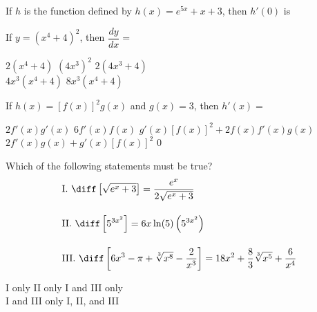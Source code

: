 \begin{questions}
    \question If $h$ is the function defined by $h(x) = e^{5x} + x + 3$, then $h'(0) $ is \\

    \begin{oneparchoices}
    \end{oneparchoices} \par \horizontalline

    \question If $y = \left(x^4 + 4\right)^2$, then $\dfrac{dy}{dx} = $ \\

    \begin{oneparchoices}
        \choice $2\left(x^4 + 4\right)$
        \choice $\left(4x^3\right)^2$
        \choice $2\left(4x^3 + 4\right)$ \\[11pt]
        \makebox[0.23 \textwidth] \choice $4x^3\left(x^4 + 4\right)$
        \makebox[0.25 \textwidth] \choice $8x^3\left(x^4 + 4\right)$
    \end{oneparchoices} \par \horizontalline

    \question If $h(x) = \left[f(x)\right]^2 g(x)$ and $g(x) = 3$, then $h'(x) = $ \\

    \begin{oneparchoices}
        \choice $2f'(x)g'(x)$
        \choice $6f'(x)f(x)$
        \choice $g'(x)\left[f(x)\right]^2 + 2f(x)f'(x)g(x)$ \\[11pt]
        \makebox[0.23 \textwidth] \choice $2f'(x)g(x) + g'(x)\left[f(x)\right]^2$
        \makebox[0.25 \textwidth] \choice $0$
    \end{oneparchoices} \par \horizontalline

    \question Which of the following statements must be true?
    \begin{align*}
        & \text{I. } \diff \left[\sqrt{e^x + 3}\right] = \dfrac{e^x}{2\sqrt{e^x + 3}} \\[11pt]
        & \text{II. } \diff \left[5^{3x^2}\right] = 6x\ln (5)\left(5^{3x^2}\right) \\[11pt]
        & \text{III. } \diff \left[6x^3 - \pi + \sqrt[3]{x^8} - \dfrac{2}{x^3}\right] = 18x^2 + \dfrac{8}{3}\sqrt[3]{x^5} + \dfrac{6}{x^4}
    \end{align*}

    \begin{oneparchoices}
        \choice I only 
        \choice II only 
        \choice I and III only \\[11pt]
        \makebox[0.2 \textwidth] \choice I and III only 
        \makebox[0.25 \textwidth] \choice I, II, and III
    \end{oneparchoices} \par \horizontalline
\end{questions}